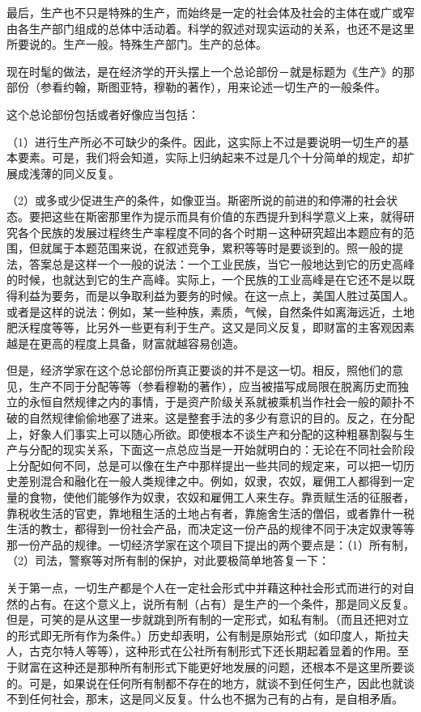 \documentclass[a4paper,twoside,12pt,AutoFakeBold]{ctexart}
\begin{document}
最后，生产也不只是特殊的生产，而始终是一定的社会体及社会的主体在或广或窄由各生产部门组成的总体中活动着。科学的叙述对现实运动的关系，也还不是这里所要说的。生产一般。特殊生产部门。生产的总体。

现在时髦的做法，是在经济学的开头摆上一个总论部份－就是标题为《生产》的那部份（参看约翰，斯图亚特，穆勒的著作），用来论述一切生产的一般条件。

这个总论部份包括或者好像应当包括：

（1）进行生产所必不可缺少的条件。因此，这实际上不过是要说明一切生产的基本要素。可是，我们将会知道，实际上归纳起来不过是几个十分简单的规定，却扩展成浅薄的同义反复。

（2）或多或少促进生产的条件，如像亚当。斯密所说的前进的和停滞的社会状态。要把这些在斯密那里作为提示而具有价值的东西提升到科学意义上来，就得研究各个民族的发展过程终生产率程度不同的各个时期－这种研究超出本题应有的范围，但就属于本题范围来说，在叙述竞争，累积等等时是要谈到的。照一般的提法，答案总是这样一个一般的说法：一个工业民族，当它一般地达到它的历史高峰的时候，也就达到它的生产高峰。实际上，一个民族的工业高峰是在它还不是以既得利益为要务，而是以争取利益为要务的时候。在这一点上，美国人胜过英国人。或者是这样的说法：例如，某一些种族，素质，气候，自然条件如离海远近，土地肥沃程度等等，比另外一些更有利于生产。这又是同义反复，即财富的主客观因素越是在更高的程度上具备，财富就越容易创造。

但是，经济学家在这个总论部份所真正要谈的并不是这一切。相反，照他们的意见，生产不同于分配等等（参看穆勒的著作），应当被描写成局限在脱离历史而独立的永恒自然规律之内的事情，于是资产阶级关系就被乘机当作社会一般的颠扑不破的自然规律偷偷地塞了进来。这是整套手法的多少有意识的目的。反之，在分配上，好象人们事实上可以随心所欲。即使根本不谈生产和分配的这种粗暴割裂与生产与分配的现实关系，下面这一点总应当是一开始就明白的：无论在不同社会阶段上分配如何不同，总是可以像在生产中那样提出一些共同的规定来，可以把一切历史差别混合和融化在一般人类规律之中。例如，奴隶，农奴，雇佣工人都得到一定量的食物，使他们能够作为奴隶，农奴和雇佣工人来生存。靠贡赋生活的征服者，靠税收生活的官吏，靠地租生活的土地占有者，靠施舍生活的僧侣，或者靠什一税生活的教士，都得到一份社会产品，而决定这一份产品的规律不同于决定奴隶等等那一份产品的规律。一切经济学家在这个项目下提出的两个要点是：（1）所有制，（2）司法，警察等对所有制的保护，对此要极简单地答复一下：

关于第一点，一切生产都是个人在一定社会形式中并藉这种社会形式而进行的对自然的占有。在这个意义上，说所有制（占有）是生产的一个条件，那是同义反复。但是，可笑的是从这里一步就跳到所有制的一定形式，如私有制。（而且还把对立的形式即无所有作为条件。）历史却表明，公有制是原始形式（如印度人，斯拉夫人，古克尔特人等等），这种形式在公社所有制形式下还长期起着显着的作用。至于财富在这种还是那种所有制形式下能更好地发展的问题，还根本不是这里所要谈的。可是，如果说在任何所有制都不存在的地方，就谈不到任何生产，因此也就谈不到任何社会，那末，这是同义反复。什么也不据为己有的占有，是自相矛盾。
\end{document}
